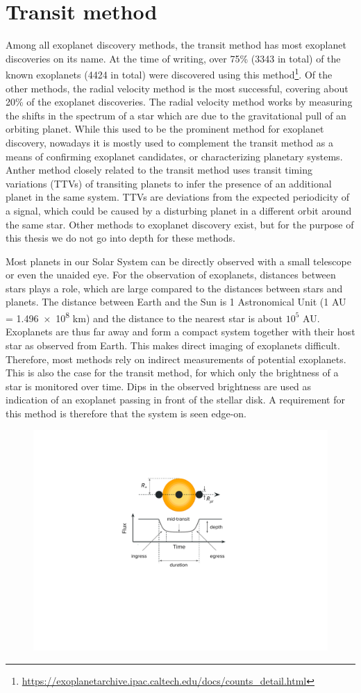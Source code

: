 
\section{Transit method}
\label{sec:transit}


Among all exoplanet discovery methods, the transit method has most exoplanet discoveries on its name. At the time of writing, over 75\% (3343 in total) of the known exoplanets (4424 in total) were discovered using this method\footnote{\url{https://exoplanetarchive.ipac.caltech.edu/docs/counts_detail.html}}. Of the other methods, the radial velocity method is the most successful, covering about 20\% of the exoplanet discoveries. The radial velocity method works by measuring the shifts in the spectrum of a star which are due to the gravitational pull of an orbiting planet. While this used to be the prominent method for exoplanet discovery, nowadays it is mostly used to complement the transit method as a means of confirming exoplanet candidates, or characterizing planetary systems. Anther method closely related to the transit method uses transit timing variations (TTVs) of transiting planets to infer the presence of an additional planet in the same system. TTVs are deviations from the expected periodicity of a signal, which could be caused by a disturbing planet in a different orbit around the same star. Other methods to exoplanet discovery exist, but for the purpose of this thesis we do not go into depth for these methods.

Most planets in our Solar System can be directly observed with a small telescope or even the unaided eye. For the observation of exoplanets, distances between stars plays a role, which are large compared to the distances between stars and planets. The distance between Earth and the Sun is 1 Astronomical Unit (1 AU = \num{1.496e8} km) and the distance to the nearest star is about $10^5$ AU. Exoplanets are thus far away and form a compact system together with their host star as observed from Earth. This makes direct imaging of exoplanets difficult. Therefore, most methods rely on indirect measurements of potential exoplanets. This is also the case for the transit method, for which only the brightness of a star is monitored over time. Dips in the observed brightness are used as indication of an exoplanet passing in front of the stellar disk. A requirement for this method is therefore that the system is seen edge-on. 

\begin{figure}
    \centering
    \includegraphics[width=0.4\linewidth]{Background/Figures/transit_drawing.pdf}
    \caption{}
    \label{fig:transit}
\end{figure}

